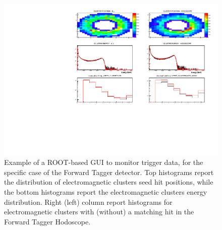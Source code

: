 \begin{figure}[t]
	\includegraphics[width=\textwidth]{img/plotAndrea.pdf}
	\caption{Example of a ROOT-based GUI to monitor trigger data, for the specific case of the Forward Tagger detector. Top histograms report the distribution of electromagnetic clusters seed hit positions, while the bottom histograms report the electromagnetic clusters energy distribution. Right (left) column report histograms for electromagnetic clusters  with (without) a matching hit in the Forward Tagger Hodoscope.}
	\label{fig:plot_andrea}
\end{figure}
